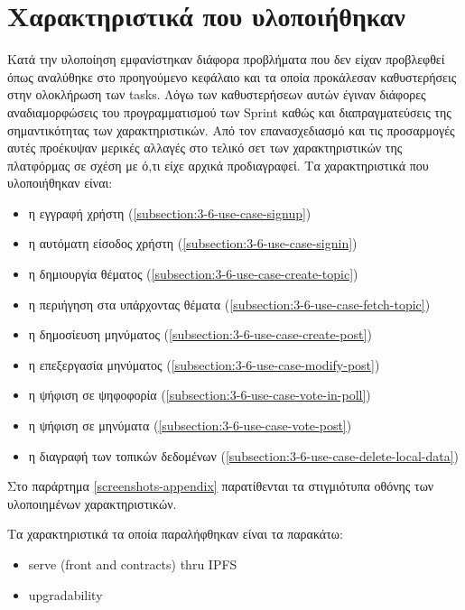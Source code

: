 \section{Χαρακτηριστικά που υλοποιήθηκαν} \label{section:4-5-implemented-parts}

Κατά την υλοποίηση εμφανίστηκαν διάφορα προβλήματα που δεν είχαν προβλεφθεί όπως αναλύθηκε στο προηγούμενο κεφάλαιο και τα οποία προκάλεσαν καθυστερήσεις στην ολοκλήρωση των tasks. Λόγω των καθυστερήσεων αυτών έγιναν διάφορες αναδιαμορφώσεις του προγραμματισμού των Sprint καθώς και διαπραγματεύσεις της σημαντικότητας των χαρακτηριστικών. Από τον επανασχεδιασμό και τις προσαρμογές αυτές προέκυψαν μερικές αλλαγές στο τελικό σετ των χαρακτηριστικών της πλατφόρμας σε σχέση με ό,τι είχε αρχικά προδιαγραφεί. Τα χαρακτηριστικά που υλοποιήθηκαν είναι:

\begin{itemize}
    \item η εγγραφή χρήστη (\ref{subsection:3-6-use-case-signup})
    \item η αυτόματη είσοδος χρήστη (\ref{subsection:3-6-use-case-signin})
    \item η δημιουργία θέματος (\ref{subsection:3-6-use-case-create-topic})
    \item η περιήγηση στα υπάρχοντας θέματα (\ref{subsection:3-6-use-case-fetch-topic})
    \item η δημοσίευση μηνύματος (\ref{subsection:3-6-use-case-create-post})
    \item η επεξεργασία μηνύματος (\ref{subsection:3-6-use-case-modify-post})
    \item η ψήφιση σε ψηφοφορία (\ref{subsection:3-6-use-case-vote-in-poll})
    \item η ψήφιση σε μηνύματα (\ref{subsection:3-6-use-case-vote-post})
    \item η διαγραφή των τοπικών δεδομένων (\ref{subsection:3-6-use-case-delete-local-data})
\end{itemize}

Στο παράρτημα \ref{screenshots-appendix} παρατίθενται τα στιγμιότυπα οθόνης των υλοποιημένων χαρακτηριστικών.

Τα χαρακτηριστικά τα οποία παραλήφθηκαν είναι τα παρακάτω:

\begin{itemize}
    \item serve (front and contracts) thru IPFS
    \item upgradability
\end{itemize}

